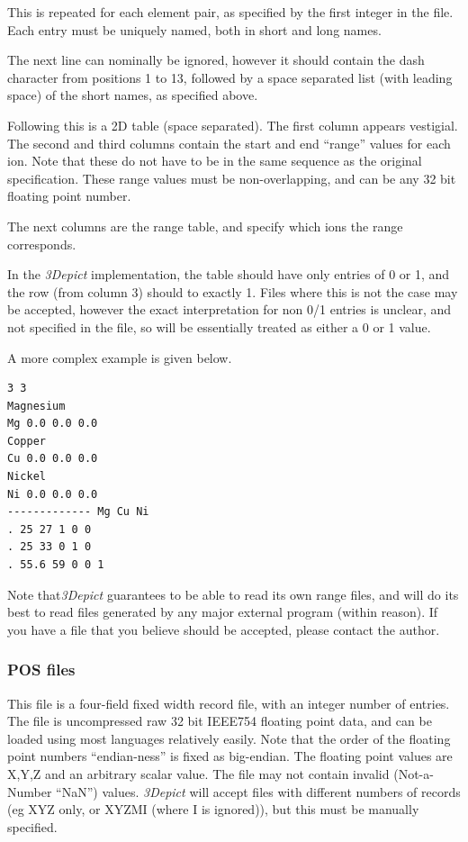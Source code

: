 \documentclass[10pt]{article}
\begin{document}
This is repeated for each element pair, as specified by the first integer in the file. Each entry must be uniquely named, both in short and long names.

The next line can nominally be ignored, however it should contain the dash character from positions 1 to 13, followed by a space separated list (with leading space) of the short names, as specified above.

Following this is a 2D table (space separated). The first column appears vestigial. The second and third columns contain the start and end ``range'' values for each ion. Note that these do not have to be in the same sequence as the original specification. These range values must be non-overlapping, and can be any 32 bit floating point number.

The next columns are the range table, and specify which ions the range corresponds.

In the \emph{3Depict} implementation, the table should have only entries of 0 or 1, and the row  (from column 3) should to exactly 1. Files where this is not the case may be accepted, however the exact interpretation for non 0/1 entries is unclear, and not specified in the file, so will be essentially treated as either a 0 or 1 value. 

A more complex example is given below.

\begin{verbatim}
3 3
Magnesium
Mg 0.0 0.0 0.0
Copper
Cu 0.0 0.0 0.0
Nickel
Ni 0.0 0.0 0.0
------------- Mg Cu Ni
. 25 27 1 0 0
. 25 33 0 1 0
. 55.6 59 0 0 1
\end{verbatim}

Note that\emph{3Depict} guarantees to be able to read its own range files, and will do its best to read files generated by any major external program (within reason). If you have a file that you believe should be accepted, please contact the author.

\subsubsection{POS files}
\label{sec:posformat}
This file is a four-field fixed width record file, with an integer number of entries. The file is uncompressed raw 32 bit IEEE754 floating point data, and can be loaded using most languages relatively easily. Note that the order of the floating point numbers ``endian-ness'' is fixed as big-endian. The floating point values are X,Y,Z and an arbitrary scalar value. The file may not contain invalid (Not-a-Number ``NaN'') values. \emph{3Depict} will accept files with different numbers of records (eg XYZ only, or XYZMI (where I is ignored)), but this must be manually specified.
\end{document}
